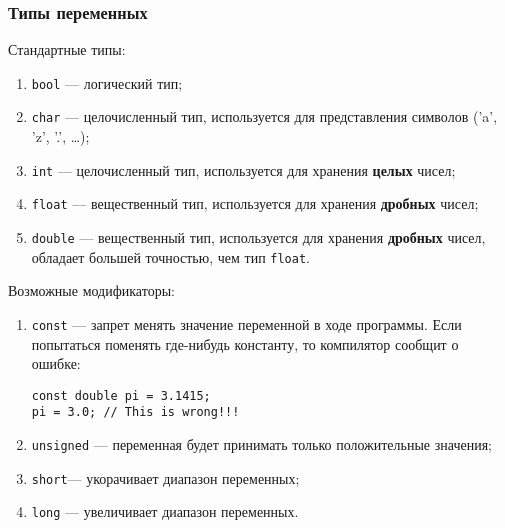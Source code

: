 \subsubsection{Типы переменных}
Стандартные типы:
\begin{enumerate}
    \item \lstinline|bool| --- логический тип;
    \item \lstinline|char| --- целочисленный тип, используется для представления символов ('a', 'z', '.', \ldots);
    \item \lstinline|int| --- целочисленный тип, используется для хранения \textbf{целых} чисел;
    \item \lstinline|float| --- вещественный тип, используется для хранения \textbf{дробных} чисел;
    \item \lstinline|double| --- вещественный тип, используется для хранения \textbf{дробных} чисел, обладает большей точностью, чем тип \lstinline|float|.
\end{enumerate}

Возможные модификаторы:
\begin{enumerate}
    \item \lstinline|const| --- запрет менять значение переменной в ходе программы. Если попытаться поменять где-нибудь константу, то компилятор сообщит о ошибке:
    \begin{lstlisting}
const double pi = 3.1415;
pi = 3.0; // This is wrong!!!
    \end{lstlisting}
    \item \lstinline|unsigned| --- переменная будет принимать только положительные значения;
    \item \lstinline|short|--- укорачивает диапазон переменных;
    \item \lstinline|long| --- увеличивает диапазон переменных.
\end{enumerate}

